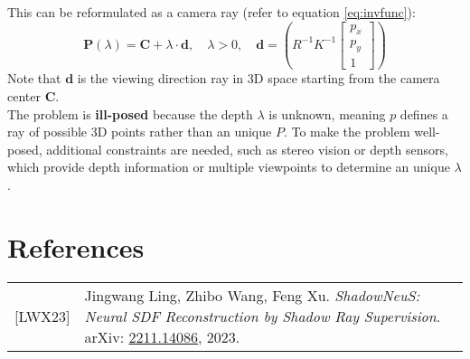 \documentclass[12pt]{article}
\begin{document}
This can be reformulated as a camera ray (refer to equation \eqref{eq:invfunc}):
\begin{equation}
    \mathbf{P}(\lambda) = \mathbf{C} + \lambda \cdot \mathbf{d}, \quad \lambda > 0, \quad \mathbf{d} = \left( R^{-1} K^{-1} \begin{bmatrix} p_x \\ p_y \\ 1 \end{bmatrix} \right) \label{eq:camera_ray}
\end{equation}
Note that \( \mathbf{d}\) is the viewing direction ray in 3D space starting from the camera center \( \mathbf{C} \). \\
The problem is \textbf{ill-posed} because the depth $\lambda$ is unknown, meaning $p$ defines a ray of possible 3D points rather than an unique $P$. To make the problem well-posed, additional constraints are needed, such as stereo vision or depth sensors, which provide depth information or multiple viewpoints to determine an unique $\lambda$.

\newpage
\section*{References}
\begin{tabular}{@{}p{} p{}}
{[LWX23]} & Jingwang Ling, Zhibo Wang, Feng Xu. \textit{ShadowNeuS: Neural SDF Reconstruction by Shadow Ray Supervision}. arXiv: \href{https://arxiv.org/abs/2211.14086}{2211.14086}, 2023.
\end{tabular}
\end{document}

